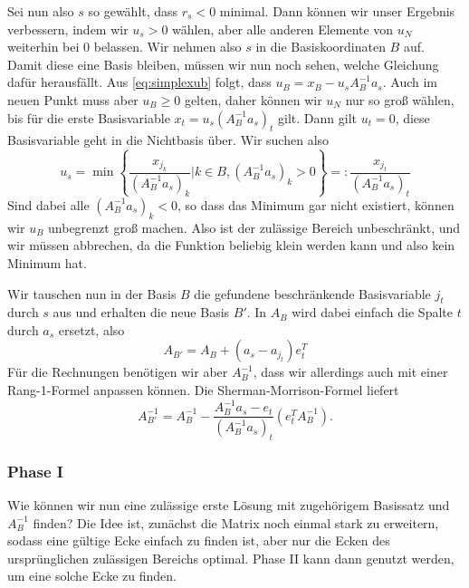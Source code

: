 Sei nun also $s$ so gewählt, dass $r_s< 0$ minimal. Dann können wir
unser Ergebnis verbessern, indem wir $u_s>0$ wählen, aber alle
anderen Elemente von $u_N$ weiterhin bei 0 belassen. Wir nehmen also
$s$ in die Basiskoordinaten $B$ auf. Damit diese eine Basis bleiben,
müssen wir nun noch sehen, welche Gleichung dafür herausfällt. Aus
\eqref{eq:simplexub} folgt, dass $u_B = x_B - u_s A_B^{-1}a_s$.  Auch
im neuen Punkt muss aber $u_B\ge 0$ gelten, daher können wir $u_N$ nur
so groß wählen, bis für die erste Basisvariable $x_t= u_s
(A_B^{-1}a_s)_t$ gilt. Dann gilt $u_t=0$, \dh diese Basisvariable
geht in die Nichtbasis über.
Wir suchen also
\begin{equation}
  u_s = \min \left\{\frac{x_{j_k}}{(A_B^{-1}a_s)_k} | k\in B,
      (A_B^{-1}a_s)_k > 0\right\} =:
  \frac{x_{j_t}}{(A_B^{-1}a_s)_t}
\end{equation}
Sind dabei alle $(A_B^{-1}a_s)_k < 0$, so dass das Minimum gar nicht
existiert, können wir $u_B$ unbegrenzt groß machen. Also ist der
zulässige Bereich unbeschränkt, und wir müssen abbrechen, da die
Funktion beliebig klein werden kann und also kein Minimum hat.

Wir tauschen nun in der Basis $B$ die gefundene beschränkende
Basisvariable  $j_t$ durch $s$ aus und erhalten die
neue Basis $B'$. In $A_B$ wird dabei einfach die Spalte $t$ durch
$a_s$ ersetzt, also
\begin{equation}
  A_{B'} = A_B + (a_s - a_{j_t})e_t^T
\end{equation}
Für die Rechnungen benötigen wir aber $A_B^{-1}$, dass wir allerdings
auch mit einer Rang-1-Formel anpassen können. Die
Sherman-Morrison-Formel liefert
\begin{equation}
  \label{eq:simplexex}
  A_{B'}^{-1} = A_{B}^{-1} - \frac{A_B^{-1}a_s - e_t}{(A_B^{-1}a_s)_t}
  \left(e_t^TA_{B}^{-1}\right).
\end{equation}

\subsubsection*{Phase I}

Wie können wir nun eine zulässige erste Lösung mit zugehörigem
Basissatz und $A_B^{-1}$ finden? Die Idee ist, zunächst die Matrix
noch einmal stark zu erweitern, sodass eine gültige Ecke einfach zu
finden ist, aber nur die Ecken des ursprünglichen zulässigen Bereichs
optimal. Phase II kann dann genutzt werden, um eine solche Ecke zu finden.

